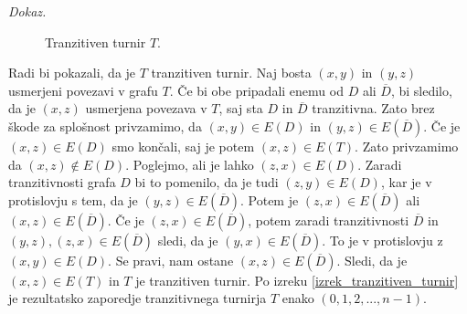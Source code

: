 \documentclass[a4paper, 12pt]{book}
\newenvironment{dokaz}{\emph{Dokaz.}\ }{\hspace{\fill}{$\Box$}}
\begin{document}
\begin{dokaz}
\begin{figure}[h]
\begin{center}
        \end{center}
        \caption{ Tranzitiven turnir $T$.}
        \label{graf_tranzitivni_turnir}
    \end{figure}
    Radi bi pokazali, da je $T$ tranzitiven turnir. Naj bosta $(x, y)$ in $(y, z)$ usmerjeni povezavi v grafu $T$. Če bi obe pripadali enemu od $D$ ali $\overline{D}$, bi sledilo, da je $(x, z)$ usmerjena povezava v $T$, saj sta $D$ in $\overline{D}$ tranzitivna. Zato brez škode za splošnost privzamimo, da $(x, y) \in E(D) $ in $(y, z) \in E(\overline{D})$. Če je $(x, z) \in E(D)$ smo končali, saj je potem $(x, z) \in E(T)$. Zato privzamimo da $(x, z) \notin E(D)$. Poglejmo, ali je lahko $(z, x) \in E(D)$. Zaradi tranzitivnosti grafa $D$ bi to pomenilo, da je tudi $(z, y) \in E(D)$, kar je v protislovju s tem, da je  $(y, z) \in E(\overline{D})$. Potem je $(z, x) \in E(\overline{D})$ ali $(x, z) \in E(\overline{D})$. Če je $(z, x) \in E(\overline{D})$, potem zaradi tranzitivnosti $\overline{D}$ in $(y, z), (z, x) \in E(\overline{D})$ sledi, da je $(y, x) \in E(\overline{D})$. To je v protislovju z $(x, y) \in E(D)$. Se pravi, nam ostane $(x, z) \in E(\overline{D})$. Sledi, da je $(x, z) \in E(T)$ in $T$ je tranzitiven turnir. Po izreku \ref{izrek_tranzitiven_turnir} je rezultatsko zaporedje tranzitivnega turnirja $T$ enako $(0, 1, 2, ..., n-1)$. 
    \begin{figure}[h]
        \begin{center}
\end{center}
\end{figure}
\end{dokaz}
\end{document}
